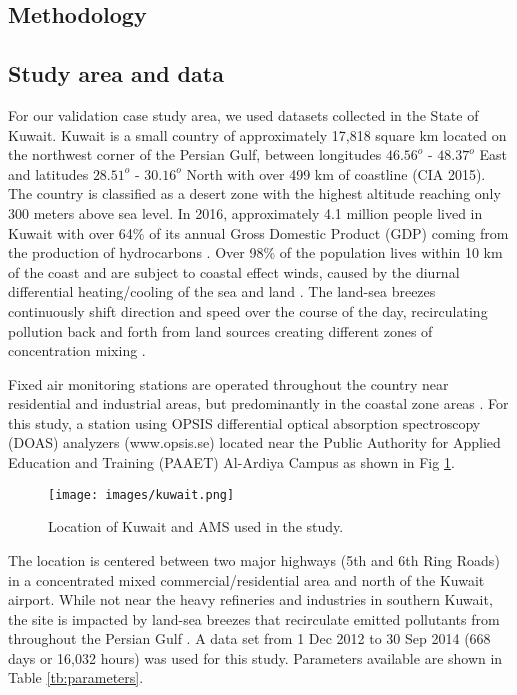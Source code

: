 \begin{linenumbers}
\section{Methodology}

\subsection{Study area and data}
For our validation case study area, we used datasets collected in the State of Kuwait. Kuwait is a small country of approximately 17,818 square km located on the northwest corner of the Persian Gulf, between longitudes $46.56^{o}$ - $48.37^{o}$ East and latitudes $28.51^{o}$ - $30.16^{o}$ North with over 499 km of coastline (CIA 2015).  The country is classified as a desert zone with the highest altitude reaching only 300 meters above sea level. In 2016, approximately 4.1 million people lived in Kuwait \citep{CSB2016} with over 64\% of its annual Gross Domestic Product (GDP) coming from the production of hydrocarbons \citep{KAMCO2013}.  Over 98\% of the population lives within 10 km of the coast and are subject to coastal effect winds, caused by the diurnal differential heating/cooling of the sea and land \citep{Crosman2010, Cuxart2014}.  The land-sea breezes continuously shift direction and speed over the course of the day, recirculating pollution back and forth from land sources creating different zones of concentration mixing \citep{Freeman2017}.

Fixed air monitoring stations are operated throughout the country near residential and industrial areas, but predominantly in the coastal zone areas \citep{Freeman2017a}. For this study, a station using OPSIS differential optical absorption spectroscopy (DOAS) analyzers (www.opsis.se) located near the Public Authority for Applied Education and Training (PAAET) Al-Ardiya Campus as shown in Fig \ref{fig:Kuwait}. 
%
\begin{figure}
\centering
\texttt{[image: images/kuwait.png]}  %
\caption{Location of Kuwait and AMS used in the study.}
\label{fig:Kuwait}
\end{figure}
%
The location is centered between two major highways (5th and 6th Ring Roads) in a concentrated mixed commercial/residential area and north of the Kuwait airport. While not near the heavy refineries and industries in southern Kuwait, the site is impacted by land-sea breezes that recirculate emitted pollutants from throughout the Persian Gulf \citep{Freeman2017}. A data set from 1 Dec 2012 to 30 Sep 2014 (668 days or 16,032 hours) was used for this study. Parameters available are shown in Table \ref{tb:parameters}.
%
\end{linenumbers}
